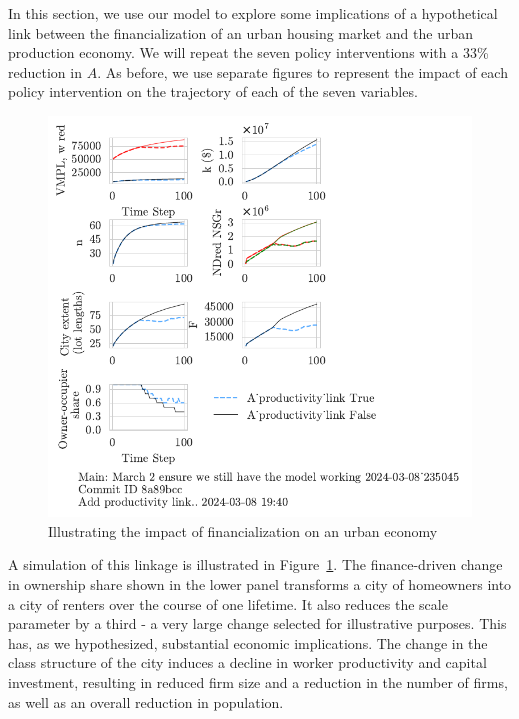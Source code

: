 In this section, we use our model to explore some implications of a hypothetical link between the financialization of an urban housing market and the urban production economy. 
We will repeat the seven policy interventions with a 33\% reduction in $A$.  As before, we use separate figures to represent the impact of each policy intervention on the trajectory of each of the seven variables. 


\begin{figure}[h!tb]\label{fig-impact-channel-example}
    \centering
    \includegraphics[scale=1, trim=.25cm 2cm .25cm .25cm, clip]{fig/productivity_link.pdf}
    \caption{Illustrating the impact of financialization on an urban economy}
\end{figure}

A simulation of this linkage is illustrated in Figure~\ref{fig-impact-channel-example}. The finance-driven change in ownership share shown in the lower panel transforms a city of homeowners into a city of renters over the course of one lifetime. It also reduces the scale parameter by a third - a very large change selected for illustrative purposes. This has, as we hypothesized, substantial economic implications. The change in the class structure of the city induces a decline in worker productivity and capital investment, resulting in reduced firm size and a reduction in the number of firms, as well as an overall reduction in population. 

